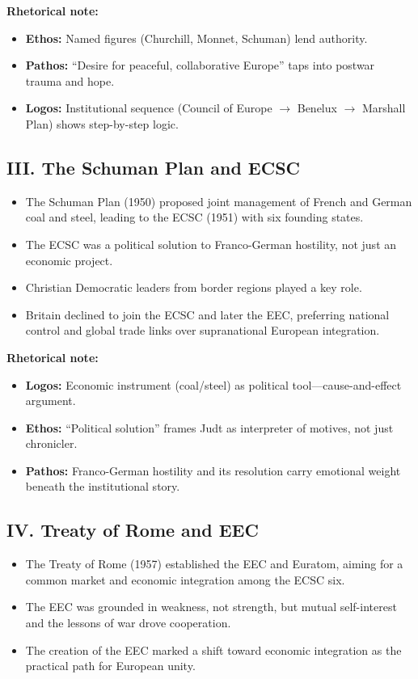 \documentclass[11pt,a4paper]{article}
\begin{document}
\textbf{Rhetorical note:}
\begin{itemize}
\item \textbf{Ethos:} Named figures (Churchill, Monnet, Schuman) lend authority.
\item \textbf{Pathos:} ``Desire for peaceful, collaborative Europe'' taps into postwar trauma and hope.
\item \textbf{Logos:} Institutional sequence (Council of Europe $\to$ Benelux $\to$ Marshall Plan) shows step-by-step logic.
\end{itemize}

\subsection*{III. The Schuman Plan and ECSC}

\begin{itemize}
\item The Schuman Plan (1950) proposed joint management of French and German coal and steel, leading to the ECSC (1951) with six founding states.
\item The ECSC was a political solution to Franco-German hostility, not just an economic project.
\item Christian Democratic leaders from border regions played a key role.
\item Britain declined to join the ECSC and later the EEC, preferring national control and global trade links over supranational European integration.
\end{itemize}

\textbf{Rhetorical note:}
\begin{itemize}
\item \textbf{Logos:} Economic instrument (coal/steel) as political tool---cause-and-effect argument.
\item \textbf{Ethos:} ``Political solution'' frames Judt as interpreter of motives, not just chronicler.
\item \textbf{Pathos:} Franco-German hostility and its resolution carry emotional weight beneath the institutional story.
\end{itemize}

\subsection*{IV. Treaty of Rome and EEC}

\begin{itemize}
\item The Treaty of Rome (1957) established the EEC and Euratom, aiming for a common market and economic integration among the ECSC six.
\item The EEC was grounded in weakness, not strength, but mutual self-interest and the lessons of war drove cooperation.
\item The creation of the EEC marked a shift toward economic integration as the practical path for European unity.
\end{itemize}
\end{document}
